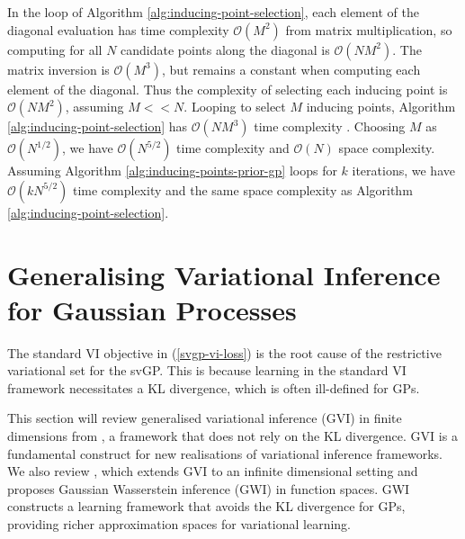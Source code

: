 \documentclass{article}
\numberwithin{equation}{section}
\begin{document}
In the loop of Algorithm \ref{alg:inducing-point-selection}, each element of the diagonal evaluation has time complexity  $\mathcal{O}(M^2)$ from matrix multiplication, so computing for all $N$ candidate points along the diagonal is $\mathcal{O}(NM^2)$.
The matrix inversion is $\mathcal{O}(M^3)$, but remains a constant when computing each element of the diagonal.
Thus the complexity of selecting each inducing point is $\mathcal{O}(NM^2)$, assuming $M << N$.
Looping to select $M$ inducing points, Algorithm \ref{alg:inducing-point-selection} has $\mathcal{O}(NM^3)$ time complexity .
Choosing $M$ as $\mathcal{O}(N^{1/2})$, we have $\mathcal{O}(N^{5/2})$ time complexity  and $\mathcal{O}(N)$ space complexity. 
Assuming Algorithm \ref{alg:inducing-points-prior-gp} loops for $k$ iterations, we have $\mathcal{O}(k N^{5/2})$ time complexity and the same space complexity as Algorithm \ref{alg:inducing-point-selection}.



\newpage
\section{Generalising Variational Inference for Gaussian Processes}\label{section:gvi-for-gps}
The standard VI objective in (\ref{svgp-vi-loss}) is the root cause of the restrictive variational set for the svGP. 
This is because learning in the standard VI framework necessitates a KL divergence, which is often ill-defined for GPs.

This section will review generalised variational inference (GVI) in finite dimensions from \cite{knoblauch2022optimization}, a framework that does not rely on the KL divergence.
GVI is a fundamental construct for new realisations of variational inference frameworks.
We also review \cite{wild2022generalized}, which extends GVI to an infinite dimensional setting and proposes Gaussian Wasserstein inference (GWI) in function spaces.
GWI constructs a learning framework that avoids the KL divergence for GPs, providing richer approximation spaces for variational learning.
\end{document}
